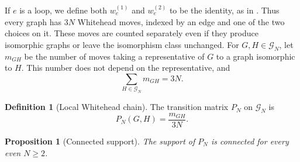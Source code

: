 \documentclass[11pt]{article}
\newcommand{\C}{\mathcal G}
\theoremstyle{plain}
\newtheorem{proposition}[proposition]{Proposition}
\theoremstyle{definition}
\newtheorem{definition}[definition]{Definition}
\numberwithin{equation}{section}
\begin{document}
If $e$ is a loop, we define both $w_e^{(1)}$ and $w_e^{(2)}$ to be the
identity, as in \cite{GraveDePeraltaKolpakov2024}.  Thus every graph has
$3N$ Whitehead moves, indexed by an edge and one of the two choices on it.
These moves are counted separately even if they produce isomorphic graphs
or leave the isomorphism class unchanged.  For $G,H\in\C_N$, let $m_{GH}$
be the number of moves taking a representative of $G$ to a graph isomorphic
to $H$.  This number does not depend on the representative, and
\[
  \sum_{H\in\C_N}m_{GH}=3N.
\]

\begin{definition}[Local Whitehead chain]
The transition matrix $P_N$ on $\C_N$ is
\begin{equation}\label{eq:kernel}
  P_N(G,H)=\frac{m_{GH}}{3N}.
\end{equation}
\end{definition}

\begin{proposition}[Connected support]\label{prop:connected-support}
The support of $P_N$ is connected for every even $N\geq2$.
\end{proposition}
\end{document}
